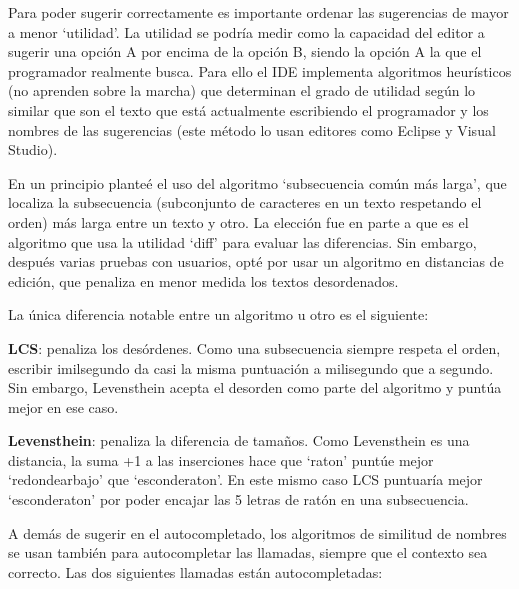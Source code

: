 \documentclass{report}
\begin{document}
	Para poder sugerir correctamente es importante ordenar las sugerencias de mayor a menor `utilidad'. La utilidad se podría medir como la capacidad del editor a sugerir una opción A por encima de la opción B, siendo la opción A la que el programador realmente busca. Para ello el IDE implementa algoritmos heurísticos (no aprenden sobre la marcha) que determinan el grado de utilidad según lo similar que son el texto que está actualmente escribiendo el programador y los nombres de las sugerencias (este método lo usan editores como Eclipse y Visual Studio).
	
	\vspace{10px}
	
	En un principio planteé el uso del algoritmo `subsecuencia común más larga'\cite{lcs}, que localiza la subsecuencia (subconjunto de caracteres en un texto respetando el orden) más larga entre un texto y otro. La elección fue en parte a que es el algoritmo que usa la utilidad `diff'\cite{diff} para evaluar las diferencias. Sin embargo, después varias pruebas con usuarios, opté por usar un algoritmo en distancias de edición\cite{levensthein}, que penaliza en menor medida los textos desordenados.
	
	La única diferencia notable entre un algoritmo u otro es el siguiente:
	
	\vspace{10px}
	
	\noindent
	\textbf{LCS}: penaliza los desórdenes. Como una subsecuencia siempre respeta el orden, escribir imilsegundo da casi la misma puntuación a milisegundo que a segundo. Sin embargo, Levensthein acepta el desorden como parte del algoritmo y puntúa mejor en ese caso.
	
	\vspace{10px}
	\noindent
	\textbf{Levensthein}: penaliza la diferencia de tamaños. Como Levensthein es una distancia, la suma +1 a las inserciones hace que `raton' puntúe mejor `redondearbajo' que `esconderaton'. En este mismo caso LCS puntuaría mejor `esconderaton' por poder encajar las 5 letras de ratón en una subsecuencia.
	
	\vspace{10px}
	
	A demás de sugerir en el autocompletado, los algoritmos de similitud de nombres se usan también para autocompletar las llamadas, siempre que el contexto sea correcto. Las dos siguientes llamadas están autocompletadas:
	
\end{document}
